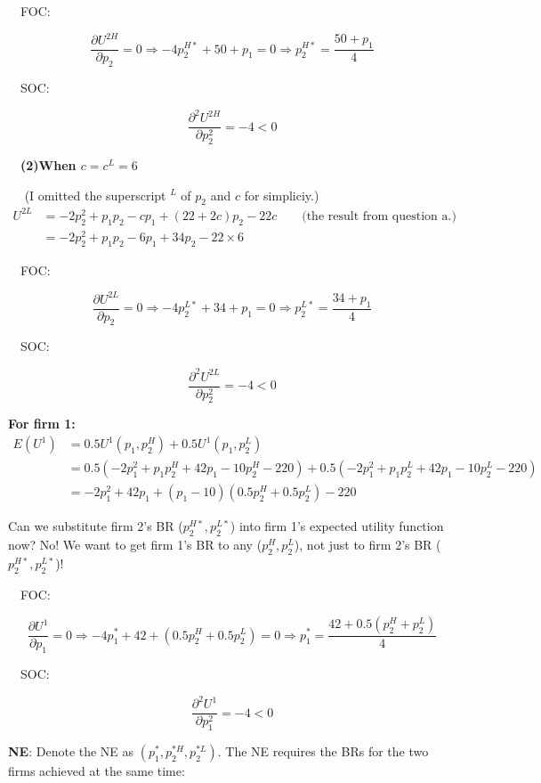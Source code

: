 \documentclass{article}
\begin{document}
$\quad $FOC:

$$\frac{\partial U^{2H}}{\partial p_2} = 0 \Rightarrow -4p^{H*}_2+ 50 + p_1 = 0 \Rightarrow p^{H*}_2 = \frac{50+p_1}{4}$$

$\quad $SOC:

$$\frac{\partial^2 U^{2H}}{\partial p^2_2} = -4 <0$$

\textbf{$\quad $(2)When $c=c^L=6$}

\smallskip

$\quad $ (I omitted the superscript $^L$ of $p_2$ and $c$ for simpliciy.)
\begin{align*}
U^{2L} &= -2p_2^2 +p_1p_2 -cp_1 + (22+2c)p_2 -22c \quad \quad \text{(the result from question a.)}  \\
&= -2p_2^2 +p_1p_2 -6p_1 + 34p_2 -22 \times 6
\end{align*}


$\quad $FOC:

$$\frac{\partial U^{2L}}{\partial p_2} = 0 \Rightarrow -4p^{L*}_2+ 34 + p_1 = 0 \Rightarrow p^{L*}_2 = \frac{34+p_1}{4}$$

$\quad $SOC:

$$\frac{\partial^2 U^{2L}}{\partial p^2_2} = -4 <0$$



\textbf{For firm 1:}
\begin{align*}
E(U^1)&= 0.5 U^1(p_1,p_2^H) + 0.5 U^1(p_1,p_2^L) \\
&= 0.5(-2p_1^2 +p_1p^H_2 + 42p_1 - 10p^H_2 -220) + 0.5(-2p_1^2 +p_1p^L_2 + 42p_1 - 10p^L_2 -220)\\
&=-2p_1^2 + 42p_1 +(p_1 -10)(0.5p^H_2 + 0.5p^L_2) -220
\end{align*}

\begin{mdframed}[backgroundcolor=blue!20,linecolor=white]
Can we substitute firm 2's BR ($p^{H*}_2, p^{L*}_2$) into firm 1's expected utility function now? No! We want to get firm 1's BR to any ($p^H_2, p^L_2$), not just to firm 2's BR ($p^{H*}_2, p^{L*}_2$)!
\end{mdframed}

$\quad $FOC:

$$\frac{\partial U^{1}}{\partial p_1} = 0 \Rightarrow -4p^{*}_1+ 42 +(0.5p^H_2 + 0.5p^L_2) = 0 \Rightarrow p^{*}_1 = \frac{42 + 0.5(p^H_2 + p^L_2)}{4}$$

$\quad $SOC:

$$\frac{\partial^2 U^{1}}{\partial p^2_1} = -4 <0$$


\textbf{NE}: Denote the NE as $(p^*_1,p^{*H}_2,p^{*L}_2)$. The NE requires the BRs for the two firms achieved at the same time:
\end{document}
